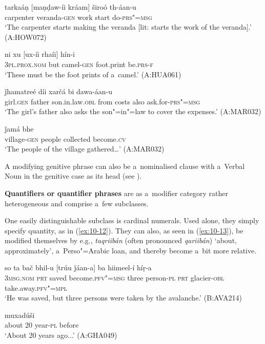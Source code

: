 \begin{exe}
\ex
\label{ex:10-8}
\gll tarkaáṇ [maṇḍaw-íi kráam] široó th-áan-u  \\
carpenter veranda-\textsc{gen} work start do-\textsc{prs"=msg} \\
\glt `The carpenter starts making the veranda [lit: starts the work of the veranda].' (A:HOW072)

\ex
\label{ex:10-9}
\gll ni xu [ux-íi rhaíi] hín-i \\
\textsc{3pl.prox.nom} but camel-\textsc{gen} foot.print be.\textsc{prs-f}  \\
\glt `These must be the foot prints of a~camel.' (A:HUA061)

\ex
\label{ex:10-10}
 ǰhamatreé díi xarčá bi dawa-áan-u \\
girl.\textsc{gen} father son.in.law.\textsc{obl} from costs also ask.for-\textsc{prs"=msg} \\
\glt `The girl's father also asks the son"=in"=law to cover the expenses.' (A:MAR032)

\ex
\label{ex:10-11}
\gll [díiš-e xálak] ǰamá bhe \\
village-\textsc{gen} people collected become.\textsc{cv} \\
\glt `The people of the village gathered{\ldots}' (A:MAR032)
\end{exe}

A modifying genitive phrase can also be a~nominalised clause with a~Verbal Noun in the genitive case as its head (see ).


\textbf{Quantifiers or quantifier phrases} are as a~modifier category rather heterogeneous and comprise a~few subclasses.  


One easily distinguishable subclass is cardinal numerals. Used alone, they simply specify quantity, as in (\ref{ex:10-12}). They can also, as seen in (\ref{ex:10-13}), be modified themselves by e.g., \textit{taqriibán} (often pronounced \textit{qariibán}) `about, approximately', a~Perso"=Arabic loan, and thereby become a~bit more relative.

\begin{exe}
\ex
\label{ex:10-12}
\gll so ta bač bhil-u [trúu ǰáan-a] ba hiimeel-í híṛ-a  \\
\textsc{3msg.nom} \textsc{prt} saved become.\textsc{pfv"=msg} three  person-\textsc{pl} \textsc{prt} glacier-\textsc{obl} take.away.\textsc{pfv"=mpl} \\
\glt `He was saved, but three persons were taken by the avalanche.' (B:AVA214)

\ex
\label{ex:10-13}
 muxadúši  \\
about 20 year-\textsc{pl} before \\
\glt `About 20 years ago...' (A:GHA049)
\end{exe}

